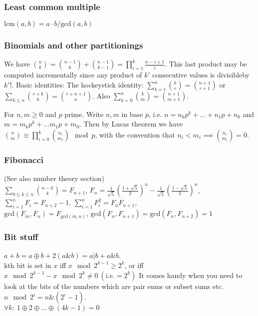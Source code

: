 \documentclass[
	a4paper,
	landscape,
	10pt,
]{article}
\begin{document}
		\subsubsection*{Least common multiple}
		$\text{lcm}(a, b) = a \cdot b / \text{gcd}(a, b)$

		\subsubsection*{Binomials and other partitionings}
		We have $\binom{n}{k} = \binom{n-1}{k}+\binom{n-1}{k-1} =
			\prod_{i=1}^k \frac{n-i+1}{i}$. This last product may be computed
		incrementally since any product of $k'$ consecutive values is divisibleby
		$k'!$.
		Basic identities: The hockeystick identity: $\sum_{k=r}^n \binom{k}{r}
			= \binom{n+1}{r+1}$
		or $\sum_{k\leq n}\binom{r+k}{k} = \binom{r+n+1}{n}$.
		Also $\sum_{k=0}^n \binom{k}{m} = \binom{n+1}{m+1}$.

		For $n, m \geq 0$ and $p$ prime. Write $n, m$ in base $p$, i.e.
		$n = n_k p^k + \dots + n_1 p + n_0$ and $m = m_k p^k + \dots m_1 p + m_0$. Then
		by Lucas theorem we have $\binom{n}{m} \equiv \prod_{i=0}^k \binom{n_i}{m_i}
		\mod p$, with the convention that $n_i < m_i \implies \binom{n_i}{m_i} =0$.

		\subsubsection*{Fibonacci} (See also number theory section) \\
 		$\sum_{0 \leq k \leq n} \binom{n-k}{k} = F_{n+1}$, 
		$F_n = \frac{1}{\sqrt{5}} \left(\frac{1+\sqrt{5}}{2}\right)^n - \frac{1}{\sqrt{5}}\left(\frac{1-\sqrt{5}}{2}\right)^n$, \\
		$\sum_{i=1}^{n} {F_i} = F_{n+2}-1$, $\sum_{i=1}^{n} {F_i^2} = F_{n}F_{n+1}$, \\
		$\text{gcd}(F_m, F_n) = F_{\text{gcd}(m, n)}$,
		$\text{gcd}(F_n, F_{n+1}) = \text{gcd}(F_n, F_{n+2}) = 1$

		\subsubsection*{Bit stuff} $a + b = a \oplus b + 2(a\&b) = a | b + a\&b$. \\
		kth bit is set in $x$ iff $x \mod 2^{k-1} \geq 2^k$, or iff $x \mod 2^{k-1}  - x \mod 2^k \neq 0~(\text{i.e.} = 2^k)$ It comes handy when you need to look at the bits of the numbers which are pair sums or subset sums etc. \\
		$n \mod 2^i = n\&(2^i-1)$. \\
		$\forall k:~ 1 \oplus 2 \oplus \hdots \oplus (4k-1) = 0$
\end{document}
